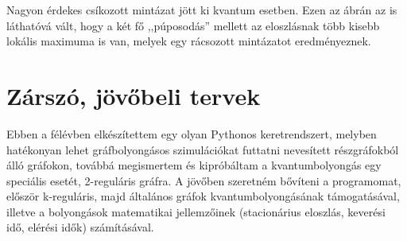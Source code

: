 Nagyon érdekes csíkozott mintázat jött ki kvantum esetben. Ezen az ábrán az is
láthatóvá vált, hogy a két fő ,,púposodás'' mellett az eloszlásnak több kisebb
lokális maximuma is van, melyek egy rácsozott mintázatot eredményeznek.

\chapter{Zárszó, jövőbeli tervek}

Ebben a félévben elkészítettem egy olyan Pythonos keretrendszert, melyben
hatékonyan lehet gráfbolyongásos szimulációkat futtatni nevesített
részgráfokból álló gráfokon, továbbá megismertem és kipróbáltam a
kvantumbolyongás egy speciális esetét, 2-reguláris gráfra. A jövőben szeretném
bővíteni a programomat, először k-reguláris, majd általános gráfok
kvantumbolyongásának támogatásával, illetve a bolyongások matematikai
jellemzőinek (stacionárius eloszlás, keverési idő, elérési idők) számításával.
